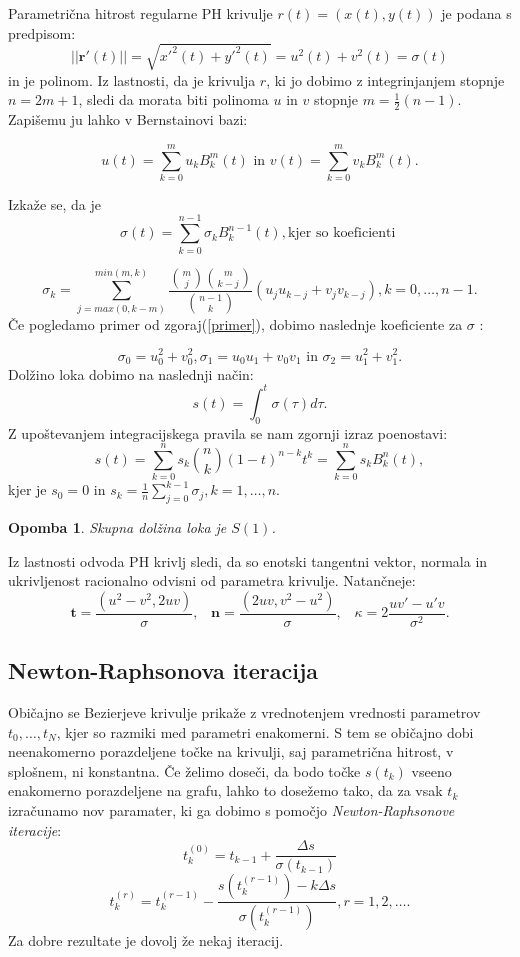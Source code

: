 \documentclass[12pt]{article}
\newtheorem{Opomba}[Izrek]{{\sc Opomba}}
\begin{document}
Parametrična hitrost regularne PH krivulje $r(t) = (x(t), y(t))$ je podana s predpisom:
$$ || \textbf{r}\prime (t) || =\sqrt{x\prime^2(t)+y\prime^2(t)}= u^2 (t) + v^2 (t) = \sigma (t)$$
in je polinom. \newline
Iz lastnosti, da je krivulja $r$, ki jo dobimo z integrinjanjem stopnje $n = 2m + 1$, sledi
da morata biti polinoma $u$ in $v$ stopnje  $m = \frac{1}{2}(n - 1)$. Zapišemu ju lahko v 
Bernstainovi bazi:

	$$u (t)=\sum_{k=0}^m u_kB_k^m(t) \text{ in } v (t) =\sum_{k=0}^m v_kB_k^m(t).$$
	

\noindent Izkaže se, da je 
$$\sigma (t) =\sum_{k=0}^{n-1} \sigma_kB_k^{n-1}(t), \text{kjer so koeficienti }$$ 

$$\sigma_k =\sum_{j=max(0,k-m)}^{min(m,k)}\frac{\binom{m}{j}\binom{m}{k-j}}{\binom{n-1}{k}}(u_ju_{k-j}+v_jv_{k-j}), k = 0,\ldots , n - 1.$$
\newline
Če pogledamo primer od zgoraj(\ref{primer}), dobimo naslednje koeficiente za $\sigma $ :

$$\sigma_0 = u^2_0+ v^2_0, 
\sigma_1 = u_0u_1 + v_0v_1 \text{ in }  
\sigma_2 = u^2_1+ v^2_1.$$
\newline
Dolžino loka dobimo na naslednji način:
$$s (t) =\int^t_0\sigma(\tau) d\tau.$$
Z upoštevanjem integracijskega pravila se nam zgornji izraz poenostavi: 
$$s (t) =\sum^n_{k=0}s_k\binom{n}{k}(1-t)^{n-k}t^k=\sum_{k=0}^n s_kB^n_k(t),$$
kjer je $s_0=0$ in $s_k=\frac{1}{n}\sum^{k-1}_{j=0}\sigma_j, k=1,\ldots,n.$
\begin{Opomba}
	Skupna dolžina loka je $S(1)$. 
\end{Opomba}

Iz lastnosti odvoda PH krivlj sledi, da so enotski tangentni vektor,
normala in ukrivljenost racionalno odvisni od parametra krivulje. Natančneje: 
$$\textbf{t} =\frac{(u^2 - v^2, 2uv)}{\sigma},\hspace{10pt} \textbf{n} =\frac{(2uv, v^2 - u^2)}{\sigma},\hspace{10pt} \kappa = 2 \frac{uv\prime - u\prime v}{\sigma^2}.$$

\subsection*{Newton-Raphsonova iteracija}
Običajno se Bezierjeve krivulje prikaže z vrednotenjem vrednosti parametrov  $t_0,\ldots , t_N$, kjer so razmiki med parametri enakomerni.
S tem se običajno dobi neenakomerno porazdeljene točke na krivulji, saj parametrična 
hitrost, v splošnem, ni konstantna.
Če želimo doseči, da bodo točke $s(t_k)$ vseeno enakomerno porazdeljene na grafu,
lahko to dosežemo tako, da za vsak $t_k$ izračunamo nov paramater, ki ga dobimo 
s pomočjo \textit{Newton-Raphsonove iteracije}: 
$$t^{(0)}_k = t_{k-1}+\frac{\Delta s}{\sigma(t_{k-1})}$$
$$t^{(r)}_k = t^{(r-1)}_k-\frac{s(t^{(r-1)}_k)-k\Delta s}{\sigma(t^{(r-1)}_k)}, r = 1, 2,\ldots.$$
Za dobre rezultate je dovolj že nekaj iteracij.
\end{document}
